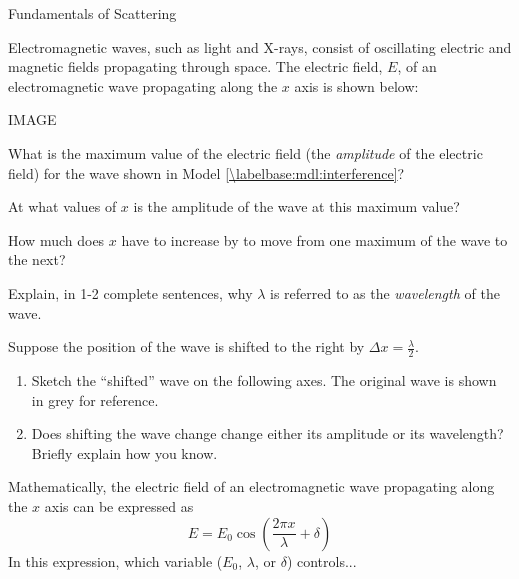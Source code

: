 \begin{activity}{Fundamentals of Scattering}
\begin{instructornotes}
\end{instructornotes}



\begin{model}
	\label{\labelbase:mdl:interference}
	
	Electromagnetic waves, such as light and X-rays, consist of oscillating electric and magnetic fields propagating through space.
	The electric field, $E$, of an electromagnetic wave propagating along the $x$ axis is shown below:
	
	IMAGE
	
\end{model}


\begin{ctqs}

	\question What is the maximum value of the electric field (the \emph{amplitude} of the electric field) for the wave shown in Model \ref{\labelbase:mdl:interference}?
	
	\question At what values of $x$ is the amplitude of the wave at this maximum value?
	
	\question How much does $x$ have to increase by to move from one maximum of the wave to the next?
	
	\question Explain, in 1-2 complete sentences, why $\lambda$ is referred to as the \emph{wavelength} of the wave.
	
	\question Suppose the position of the wave is shifted to the right by $\Delta x = \frac{\lambda}{2}$.
	
		\begin{enumerate}
			\item Sketch the ``shifted'' wave on the following axes.  The original wave is shown in grey for reference.
			
			\item Does shifting the wave change change either its amplitude or its wavelength?  Briefly explain how you know.
		\end{enumerate}

	\question Mathematically, the electric field of an electromagnetic wave propagating along the $x$ axis can be expressed as
	\begin{equation*}
		E = E_0 \cos\left( \frac{2\pi x}{\lambda} + \delta \right)
	\end{equation*}
	In this expression, which variable ($E_0$, $\lambda$, or $\delta$) controls...
	
		\begin{enumerate}
		

\end{enumerate}
\end{ctqs}
\end{activity}
